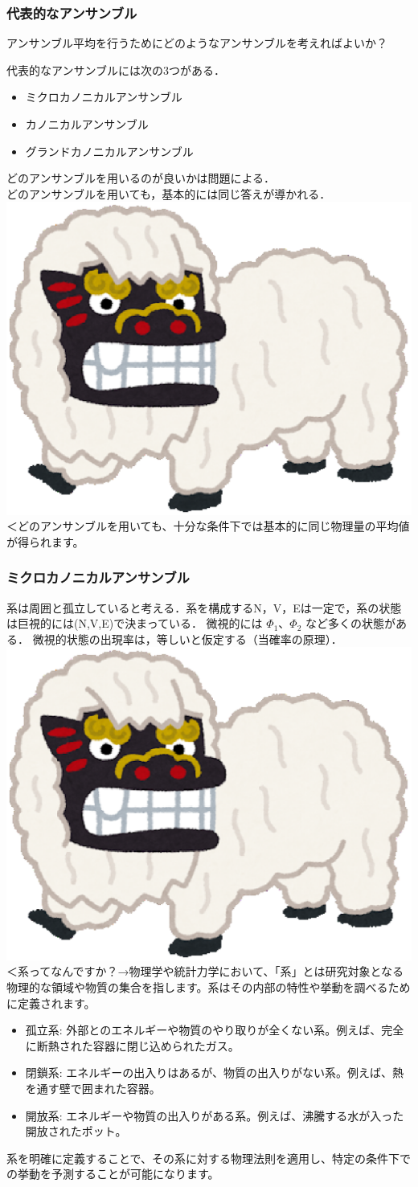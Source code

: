 \documentclass{beamer}
\newcommand{\shishimai}[1][0.1\textwidth]{%
  \includegraphics[width=#1 cm]{fig/okinawa_shishimai.eps}
}
\begin{document}
\begin{frame}
  \frametitle{代表的なアンサンブル}
  アンサンブル平均を行うためにどのようなアンサンブルを考えればよいか？

  代表的なアンサンブルには次の3つがある．
  \begin{itemize}
      \item ミクロカノニカルアンサンブル
      \item カノニカルアンサンブル
      \item グランドカノニカルアンサンブル
  \end{itemize}

  どのアンサンブルを用いるのが良いかは問題による．\\どのアンサンブルを用いても，基本的には同じ答えが導かれる．
  \shishimai[1] ＜どのアンサンブルを用いても、十分な条件下では基本的に同じ物理量の平均値が得られます。

\end{frame}

\begin{frame}
  \frametitle{ミクロカノニカルアンサンブル}
  系は周囲と孤立していると考える．系を構成するN，V，Eは一定で，系の状態は巨視的には(N,V,E)で決まっている．
  微視的には \(\Phi_1\)、\(\Phi_2\) など多くの状態がある．
  \newline
  微視的状態の出現率は，等しいと仮定する（当確率の原理）．
  \shishimai[1]＜系ってなんですか？→物理学や統計力学において、「系」とは研究対象となる物理的な領域や物質の集合を指します。系はその内部の特性や挙動を調べるために定義されます。
  \begin{itemize}
    \item 孤立系: 外部とのエネルギーや物質のやり取りが全くない系。例えば、完全に断熱された容器に閉じ込められたガス。
    \item 閉鎖系: エネルギーの出入りはあるが、物質の出入りがない系。例えば、熱を通す壁で囲まれた容器。
    \item 開放系: エネルギーや物質の出入りがある系。例えば、沸騰する水が入った開放されたポット。
  \end{itemize}
  系を明確に定義することで、その系に対する物理法則を適用し、特定の条件下での挙動を予測することが可能になります。

\end{frame}
\end{document}
